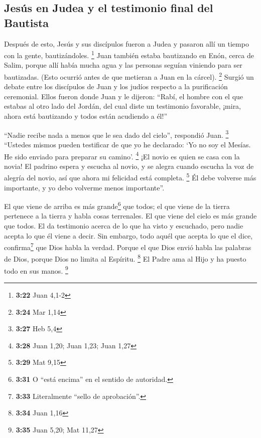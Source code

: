 \hypertarget{jesuxfas-en-judea-y-el-testimonio-final-del-bautista}{%
\subsection{Jesús en Judea y el testimonio final del
Bautista}\label{jesuxfas-en-judea-y-el-testimonio-final-del-bautista}}

 Después de esto, Jesús y sus discípulos fueron a Judea y
pasaron allí un tiempo con la gente, bautizándoles. \footnote{\textbf{3:22}
  Juan 4,1-2}  Juan también estaba bautizando en Enón,
cerca de Salim, porque allí había mucha agua y las personas seguían
viniendo para ser bautizadas.  (Esto ocurrió antes de que
metieran a Juan en la cárcel). \footnote{\textbf{3:24} Mar 1,14}
 Surgió un debate entre los discípulos de Juan y los
judíos respecto a la purificación ceremonial.  Ellos
fueron donde Juan y le dijeron: ``Rabí, el hombre con el que estabas al
otro lado del Jordán, del cual diste un testimonio favorable, ¡mira,
ahora está bautizando y todos están acudiendo a él!''

 ``Nadie recibe nada a menos que le sea dado del cielo'',
respondió Juan. \footnote{\textbf{3:27} Heb 5,4} 
``Ustedes mismos pueden testificar de que yo he declarado: `Yo no soy el
Mesías. He sido enviado para preparar su camino'. \footnote{\textbf{3:28}
  Juan 1,20; Juan 1,23; Juan 1,27}  ¡El novio es quien se
casa con la novia! El padrino espera y escucha al novio, y se alegra
cuando escucha la voz de alegría del novio, así que ahora mi felicidad
está completa. \footnote{\textbf{3:29} Mat 9,15}  Él debe
volverse más importante, y yo debo volverme menos importante''.

 El que viene de arriba es más grande\footnote{\textbf{3:31}
  O ``está encima'' en el sentido de autoridad.} que todos; el que viene
de la tierra pertenece a la tierra y habla cosas terrenales. El que
viene del cielo es más grande que todos.  El da
testimonio acerca de lo que ha visto y escuchado, pero nadie acepta lo
que él viene a decir.  Sin embargo, todo aquél que acepta
lo que el dice, confirma\footnote{\textbf{3:33} Literalmente ``sello de
  aprobación''.} que Dios habla la verdad.  Porque el que
Dios envió habla las palabras de Dios, porque Dios no limita al
Espíritu. \footnote{\textbf{3:34} Juan 1,16}  El Padre
ama al Hijo y ha puesto todo en sus manos. \footnote{\textbf{3:35} Juan
  5,20; Mat 11,27}

